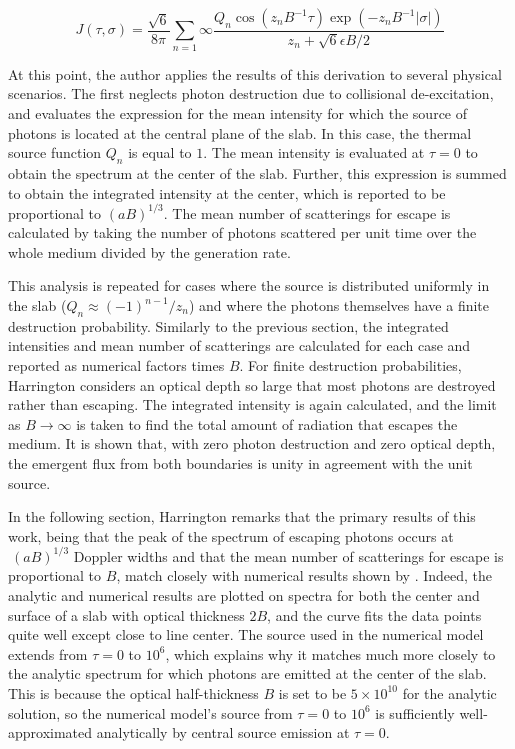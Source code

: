 \documentclass[onecolumn]{aastex63}
\begin{document}
\begin{equation}
    J(\tau, \sigma) = \frac{\sqrt{6}}{8\pi} \sum_{n=1}{\infty} \frac{Q_n \cos(z_n B^{-1}\tau)\exp(-z_n B^{-1}|\sigma|)}{z_n + \sqrt{6}\epsilon B / 2}
\end{equation}

At this point, the author applies the results of this derivation to several physical scenarios. The first neglects photon destruction due to collisional de-excitation, and evaluates the expression for the mean intensity for which the source of photons is located at the central plane of the slab. In this case, the thermal source function $Q_n$ is equal to $1$. The mean intensity is evaluated at $\tau=0$ to obtain the spectrum at the center of the slab. Further, this expression is summed to obtain the integrated intensity at the center, which is reported to be proportional to $(aB)^{1/3}$. The mean number of scatterings for escape is calculated by taking the number of photons scattered per unit time over the whole medium divided by the generation rate. 

This analysis is repeated for cases where the source is distributed uniformly in the slab ($Q_n \approx (-1)^{n-1}/z_n$) and where the photons themselves have a finite destruction probability. Similarly to the previous section, the integrated intensities and mean number of scatterings are calculated for each case and reported as numerical factors times $B$. For finite destruction probabilities, Harrington considers an optical depth so large that most photons are destroyed rather than escaping. The integrated intensity is again calculated, and the limit as $B\rightarrow\infty$ is taken to find the total amount of radiation that escapes the medium. It is shown that, with zero photon destruction and zero optical depth, the emergent flux from both boundaries is unity in agreement with the unit source.

In the following section, Harrington remarks that the primary results of this work, being that the peak of the spectrum of escaping photons occurs at $~(aB)^{1/3}$ Doppler widths and that the mean number of scatterings for escape is proportional to $B$, match closely with numerical results shown by \cite{1972ApJ...174..439A}. Indeed, the analytic and numerical results are plotted on spectra for both the center and surface of a slab with optical thickness $2B$, and the curve fits the data points quite well except close to line center. The source used in the numerical model extends from $\tau=0$ to $10^6$, which explains why it matches much more closely to the analytic spectrum for which photons are emitted at the center of the slab. This is because the optical half-thickness $B$ is set to be $5\times10^{10}$ for the analytic solution, so the numerical model's source from $\tau=0$ to $10^6$ is sufficiently well-approximated analytically by central source emission at $\tau=0$.
\end{document}
